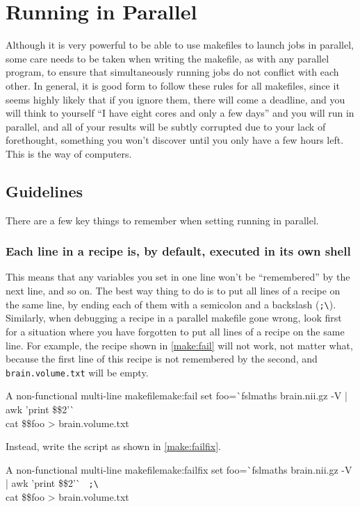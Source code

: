 \chapter{Running \maken{} in Parallel}
\label{chap:parallel}

Although it is very powerful to be able to use makefiles to launch jobs in parallel, some care needs to be taken when writing the makefile, as with any parallel program, to ensure that simultaneously running jobs do not conflict with each other. In general, it is good form to follow these rules for all makefiles, since it seems highly likely that if you ignore them, there will come a deadline, and you will think to yourself ``I have eight cores and only a few days'' and you will run \maken{} in parallel, and all of your results will be subtly corrupted due to your lack of forethought, something you won't discover until you only have a few hours left. This is the way of computers.

\section{Guidelines}

There are a few key things to remember when setting running \maken{} in parallel.

\subsection{Each line in a recipe is, by default, executed in its own shell}

This means that any variables you set in one line won't be ``remembered'' by the next line, and so on. The best way thing to do is to put all lines of a recipe on the same line, by ending each of them with a semicolon and a backslash (\texttt{;\textbackslash}). Similarly, when debugging a recipe in a parallel makefile gone wrong, look first for a situation where you have forgotten to put all lines of a recipe on the same line. For example, the recipe shown in \autoref{make:fail} will not work, not matter what, because the first line of this recipe is not remembered by the second, and \texttt{brain.volume.txt} will be empty.
\begin{make}{A non-functional multi-line makefile}{make:fail}
	set foo=\`{}fslmaths brain.nii.gz -V | awk '{print \$\$2}'\`{} \\
	cat \$\$foo > brain.volume.txt
\end{make}

Instead, write the script as shown in \autoref{make:failfix}.
\begin{make}{A non-functional multi-line makefile}{make:failfix}
	set foo=\`{}fslmaths brain.nii.gz -V | awk '{print \$\$2}'\`{} \texttt{{\color{red} ;\textbackslash}} \\
	cat \$\$foo > brain.volume.txt
\end{make}

